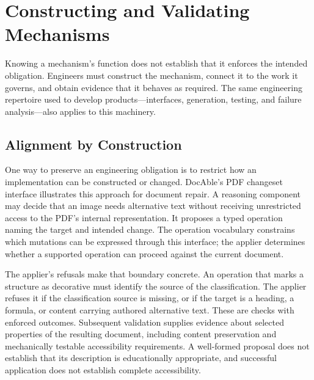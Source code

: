 \section{Constructing and Validating Mechanisms}\label{heading:constructing-and-evaluating-governance-mechanisms}

Knowing a mechanism's function does not establish that it enforces the intended obligation. Engineers must construct the mechanism, connect it to the work it governs, and obtain evidence that it behaves as required. The same engineering repertoire used to develop products---interfaces, generation, testing, and failure analysis---also applies to this machinery.

\subsection{Alignment by Construction}\label{heading:alignment-by-construction}


One way to preserve an engineering obligation is to restrict how an implementation can be constructed or changed. DocAble's PDF changeset interface illustrates this approach for document repair. A reasoning component may decide that an image needs alternative text without receiving unrestricted access to the PDF's internal representation. It proposes a typed operation naming the target and intended change. The operation vocabulary constrains which mutations can be expressed through this interface; the applier determines whether a supported operation can proceed against the current document.

The applier's refusals make that boundary concrete. An operation that marks a structure as decorative must identify the source of the classification. The applier refuses it if the classification source is missing, or if the target is a heading, a formula, or content carrying authored alternative text. These are checks with enforced outcomes. Subsequent validation supplies evidence about selected properties of the resulting document, including content preservation and mechanically testable accessibility requirements. A well-formed proposal does not establish that its description is educationally appropriate, and successful application does not establish complete accessibility.

